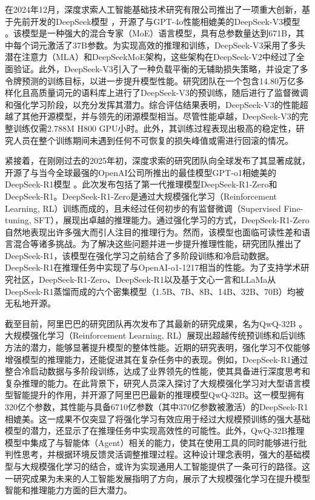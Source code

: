 在2024年12月，深度求索人工智能基础技术研究有限公司推出了一项重大创新，基于先前开发的DeepSeek模型 \cite{deepseekai2024deepseekllmscalingopensource, deepseekai2024deepseekv2strongeconomicalefficient}，开源了与GPT-4o性能相媲美的DeepSeek-V3模型 \cite{deepseekai2024deepseekv3technicalreport}。该模型是一种强大的混合专家（MoE）语言模型，具有总参数量达到671B，其中每个词元激活了37B参数。为实现高效的推理和训练，DeepSeek-V3采用了多头潜在注意力（MLA）和DeepSeekMoE架构，这些架构在DeepSeek-V2中经过了全面验证。此外，DeepSeek-V3引入了一种负载平衡的无辅助损失策略，并设定了多令牌预测的训练目标，以进一步提升模型性能。研究团队在一个包含14.80万亿多样化且高质量词元的语料库上进行了DeepSeek-V3的预训练，随后进行了监督微调和强化学习阶段，以充分发挥其潜力。综合评估结果表明，DeepSeek-V3的性能超越了其他开源模型，并与领先的闭源模型相当。尽管性能卓越，DeepSeek-V3的完整训练仅需2.788M H800 GPU小时。此外，其训练过程表现出极高的稳定性，研究人员在整个训练期间未遇到任何不可恢复的损失峰值或需进行回滚的情况。

紧接着，在刚刚过去的2025年初，深度求索的研究团队向全球发布了其显著成就，开源了与当今全球最强的OpenAI公司所推出的最佳模型GPT-o1相媲美的DeepSeek-R1模型 \cite{deepseekai2025deepseekr1incentivizingreasoningcapability}。此次发布包括了第一代推理模型DeepSeek-R1-Zero和DeepSeek-R1。DeepSeek-R1-Zero是通过大规模强化学习（Reinforcement Learning, RL）训练而成的，且未经过任何初步的有监督微调（Supervised Fine-tuning, SFT），展现出卓越的推理能力。通过强化学习的方式，DeepSeek-R1-Zero自然地表现出许多强大而引人注目的推理行为。然而，该模型也面临可读性差和语言混合等诸多挑战。为了解决这些问题并进一步提升推理性能，研究团队推出了DeepSeek-R1，该模型在强化学习之前结合了多阶段训练和冷启动数据。DeepSeek-R1在推理任务中实现了与OpenAI-o1-1217相当的性能。为了支持学术研究社区，DeepSeek-R1-Zero、DeepSeek-R1以及基于文心一言和LLaMa从DeepSeek-R1蒸馏而成的六个密集模型（1.5B、7B、8B、14B、32B、70B）均被无私地开源。

截至目前，阿里巴巴的研究团队再次发布了其最新的研究成果，名为QwQ-32B \cite{qwq32b}。大规模强化学习（Reinforcement Learning, RL）展现出超越传统预训练和后训练方法的潜力，能够显著提升模型的整体性能。近期的研究表明，强化学习不仅能够增强模型的推理能力，还能促进其在复杂任务中的表现。例如，DeepSeek-R1通过整合冷启动数据与多阶段训练，达成了业界领先的性能，使其具备进行深度思考和复杂推理的能力。在此背景下，研究人员深入探讨了大规模强化学习对大型语言模型智能提升的作用，并开源了阿里巴巴最新的推理模型QwQ-32B。这一模型拥有320亿个参数，其性能与具备6710亿参数（其中370亿参数被激活）的DeepSeek-R1相媲美。这一成果不仅突显了将强化学习有效应用于经过大规模预训练的强大基础模型的潜力，还显示了在推理任务中实现高效性的可能性。此外，QwQ-32B推理模型中集成了与智能体（Agent）相关的能力，使其在使用工具的同时能够进行批判性思考，并根据环境反馈灵活调整推理过程。这种设计理念表明，强大的基础模型与大规模强化学习的结合，或许为实现通用人工智能提供了一条可行的路径。这一研究成果为未来的人工智能发展指明了方向，展示了大规模强化学习在提升模型智能和推理能力方面的巨大潜力。

